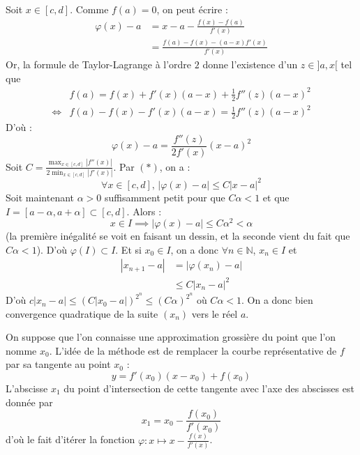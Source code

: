 	\begin{demonstration}
		Soit $x \in [c, d]$. Comme $f(a) = 0$, on peut écrire :
		\begin{align*}
			\varphi(x) - a &= x - a - \frac{f(x) - f(a)}{f'(x)} \\
			&= \frac{f(a) - f(x) - (a-x)f'(x)}{f'(x)}
		\end{align*}
		Or, la formule de Taylor-Lagrange à l'ordre $2$ donne l'existence d'un $z \in ]a, x[$ tel que
		\begin{align*}
			&f(a) = f(x) + f'(x)(a-x) + \frac{1}{2} f''(z)(a-x)^2 \\
			\iff& f(a) - f(x) - f'(x)(a-x)  = \frac{1}{2} f''(z)(a-x)^2
		\end{align*}
		D'où :
		\[ \varphi(x) - a = \frac{f''(z)}{2f'(x)}(x-a)^2 \tag{$*$} \]
		Soit $C = \frac{\max_{x \in [c, d]} |f''(x)|}{2\min_{x \in [c, d]} |f'(x)|}$. Par $(*)$, on a :
		\[ \forall x \in [c, d], \, |\varphi(x)-a| \leq C |x-a|^2 \]
		Soit maintenant $\alpha > 0$ suffisamment petit pour que $C\alpha < 1$ et que $I = [a - \alpha, a + \alpha] \subset [c, d]$. Alors :
		\[ x \in I \implies |\varphi(x) - a| \leq C\alpha^2 < \alpha \]
		(la première inégalité se voit en faisant un dessin, et la seconde vient du fait que $C\alpha < 1$). D'où $\varphi(I) \subset I$. Et si $x_0 \in I$, on a donc $\forall n \in \mathbb{N}$, $x_n \in I$ et
		\begin{align*}
			|x_{n+1} - a| &= |\varphi(x_n) - a| \\
			&\leq C |x_n - a|^2
		\end{align*}
		D'où $c |x_n - a| \leq (C |x_0 - a|)^{2^n} \leq (C \alpha)^{2^n}$ où $C \alpha < 1$. On a donc bien convergence quadratique de la suite $(x_n)$ vers le réel $a$.
	\end{demonstration}


	\begin{remark}
		On suppose que l'on connaisse une approximation grossière du point que l'on nomme $x_0$.
		L'idée de la méthode est de remplacer la courbe représentative de $f$ par sa tangente au point $x_0$ :
		\[ y = f'(x_0)(x-x_0) + f(x_0) \]
		L'abscisse $x_1$ du point d'intersection de cette tangente avec l'axe des abscisses est donnée par
		\[ x_1 = x_0 - \frac{f(x_0)}{f'(x_0)} \]
		d'où le fait d'itérer la fonction $\varphi : x \mapsto x - \frac{f(x)}{f'(x)}$.
	\end{remark}


